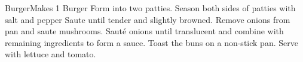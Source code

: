 \documentclass[]{article}
\title{}
\author{}
\begin{document}
\begin{recipe}{Burger}{}{Makes 1 Burger}
	Form into two patties. Season both sides of patties with salt and pepper
	Saute until tender and slightly browned. 
	Remove onions from pan and saute mushrooms. 
	Sauté onions until translucent and combine with remaining ingredients to form a sauce.
	Toast the buns on a non-stick pan. Serve with lettuce and tomato.
\end{recipe}
\end{document}
